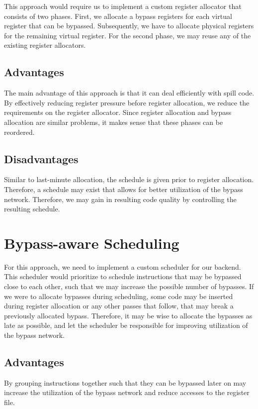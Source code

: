 This approach would require us to implement a custom register allocator that consists of two phases. First, we allocate a bypass registers for each virtual register that can be bypassed. Subsequently, we have to allocate physical registers for the remaining virtual register. For the second phase, we may reuse any of the existing register allocators. 

\subsection{Advantages}
The main advantage of this approach is that it can deal efficiently with spill code. By effectively reducing register pressure before register allocation, we reduce the requirements on the register allocator.  
Since register allocation and bypass allocation are similar problems, it makes sense that these phases can be reordered. 

\subsection{Disadvantages}
Similar to last-minute allocation, the schedule is given prior to register allocation. Therefore, a schedule may exist that allows for better utilization of the bypass network. Therefore, we may gain in resulting code quality by controlling the resulting schedule.

\section{Bypass-aware Scheduling}\label{sec:scheduling_approach}
For this approach, we need to implement a custom scheduler for our backend. This scheduler would prioritize to schedule instructions that may be bypassed close to each other, such that we may increase the possible number of bypasses. If we were to allocate bypasses during scheduling, some code may be inserted during register allocation or any other passes that follow, that may break a previously allocated bypass. Therefore, it may be wise to allocate the bypasses as late as possible, and let the scheduler be responsible for improving utilization of the bypass network. 

\subsection{Advantages}
By grouping instructions together such that they can be bypassed later on may increase the utilization of the bypass network and reduce accesses to the register file.

